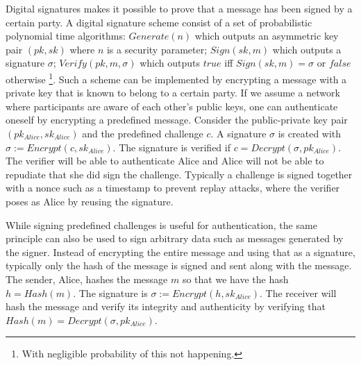 Digital signatures makes it possible to prove that a message has been signed by a certain party. A digital signature scheme consist of a set of probabilistic polynomial time algorithms: $Generate(n)$ which outputs an asymmetric key pair $(pk, sk)$ where $n$ is a security parameter; $Sign(sk, m)$ which outputs a signature $\sigma$; $Verify(pk, m, \sigma)$ which outputs $true$ iff $Sign(sk, m) = \sigma$ or $false$ otherwise \footnote{With negligible probability of this not happening.}. Such a scheme can be implemented by encrypting a message with a private key that is known to belong to a certain party. If we assume a network where participants are aware of each other's public keys, one can authenticate oneself by encrypting a predefined message. Consider the public-private key pair $(pk_{Alice}, sk_{Alice})$ and the predefined challenge $c$. A signature $\sigma$ is created with $\sigma := Encrypt(c, sk_{Alice})$. The signature is verified if $c=Decrypt(\sigma, pk_{Alice})$. The verifier will be able to authenticate Alice and Alice will not be able to repudiate that she did sign the challenge. Typically a challenge is signed together with a nonce such as a timestamp to prevent replay attacks, where the verifier poses as Alice by reusing the signature.

While signing predefined challenges is useful for authentication, the same principle can also be used to sign arbitrary data such as messages generated by the signer. Instead of encrypting the entire message and using that as a signature, typically only the hash of the message is signed and sent along with the message. The sender, Alice, hashes the message $m$ so that we have the hash $h=Hash(m)$. The signature is $\sigma := Encrypt(h, sk_{Alice})$. The receiver will hash the message and verify its integrity and authenticity by verifying that $Hash(m)=Decrypt(\sigma, pk_{Alice})$.
